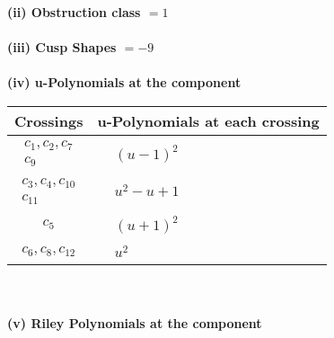 \documentclass[1p]{elsarticle_modified}
\theoremstyle{definition}
\begin{document}
\flushleft \textbf{(ii) Obstruction class $= 1$}\\~\\
\flushleft \textbf{(iii) Cusp Shapes $= -9$}\\~\\
\newpage\renewcommand{\arraystretch}{1}
\flushleft \textbf{(iv) u-Polynomials at the component}\newline \\
\begin{tabular}{m{50pt}|m{274pt}}
Crossings & \hspace{64pt}u-Polynomials at each crossing \\
\hline $$\begin{aligned}c_{1},c_{2},c_{7}\\c_{9}\end{aligned}$$&$\begin{aligned}
&(u-1)^2
\end{aligned}$\\
\hline $$\begin{aligned}c_{3},c_{4},c_{10}\\c_{11}\end{aligned}$$&$\begin{aligned}
&u^2- u+1
\end{aligned}$\\
\hline $$\begin{aligned}c_{5}\end{aligned}$$&$\begin{aligned}
&(u+1)^2
\end{aligned}$\\
\hline $$\begin{aligned}c_{6},c_{8},c_{12}\end{aligned}$$&$\begin{aligned}
&u^2
\end{aligned}$\\
\hline
\end{tabular}\\~\\
\newpage\renewcommand{\arraystretch}{1}
\flushleft \textbf{(v) Riley Polynomials at the component}\newline \\
\end{document}
